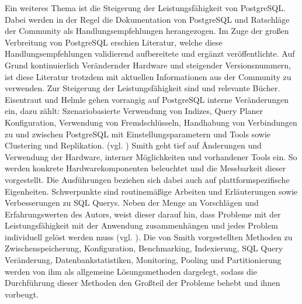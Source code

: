 Ein weiteres Thema ist die Steigerung der Leistungsfähigkeit von PostgreSQL.
Dabei werden in der Regel die Dokumentation von PostgreSQL und Ratschläge der Community als Handlungsempfehlungen herangezogen.
Im Zuge der großen Verbreitung von PostgreSQL erschien Literatur, welche diese Handlungsempfehlungen validierend aufbereitete und ergänzt veröffentlichte.
Auf Grund kontinuierlich Verändernder Hardware und steigender Versionsnummern, ist diese Literatur trotzdem mit aktuellen Informationen aus der Community zu verwenden.
Zur Steigerung der Leistungsfähigkeit sind \cite{book:postgresqladmin} und \cite{book:postgresqlperformance} relevante Bücher.
%
Eisentraut und Helmle gehen vorrangig auf PostgreSQL interne Veränderungen ein, dazu zählt:
Szenariobasierte Verwendung von Indizes, Query Planer Konfiguration, Verwendung von Fremdschlüsseln, Handhabung von Verbindungen zu und zwischen PostgreSQL mit Einstellungsparametern und Tools sowie Clustering und Replikation. (vgl. \cite[S.206 ff.]{book:postgresqladmin})
%
Smith geht tief auf Änderungen und Verwendung der Hardware, interner Möglichkeiten und vorhandener Tools ein.
So werden konkrete Hardwarekomponenten beleuchtet und die Messbarkeit dieser vorgestellt.
Die Ausführungen beziehen sich dabei auch auf plattformspezifische Eigenheiten.
Schwerpunkte sind routinemäßige Arbeiten und Erläuterungen sowie Verbesserungen zu SQL Querys.
Neben der Menge an Vorschlägen und Erfahrungswerten des Autors, weist dieser darauf hin, dass Probleme mit der Leistungsfähigkeit mit der Anwendung zusammenhängen und jedes Problem individuell gelöst werden muss (vgl. \cite[S.18]{book:postgresqlperformance}).
Die von Smith vorgestellten Methoden zu Zwischenspeicherung, Konfiguration, Benchmarking, Indexierung, SQL Query Veränderung, Datenbankstatistiken, Monitoring, Pooling und Partitionierung werden von ihm als allgemeine Lösungsmethoden dargelegt, sodass die Durchführung dieser Methoden den Großteil der Probleme behebt und ihnen vorbeugt.



